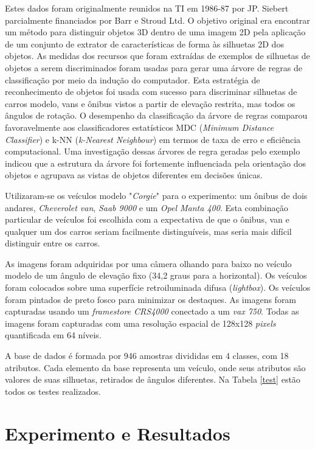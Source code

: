\documentclass[
	article,			%
	11pt,				%
	oneside,			%
	a4paper,			%
	english,			%
	brazil,				%
	sumario=tradicional
	]{abntex2}
\begin{document}
Estes dados foram originalmente reunidos na TI em 1986-87 por JP. Siebert parcialmente financiados por Barr e Stroud Ltd. O objetivo original era encontrar um método para distinguir objetos 3D dentro de uma imagem 2D pela aplicação de um conjunto de extrator de características de forma às silhuetas 2D dos objetos. As medidas dos recursos que foram extraídas de exemplos de silhuetas de objetos a serem discriminados foram usadas para gerar uma árvore de regras de classificação por meio da indução do computador. Esta estratégia de reconhecimento de objetos foi usada com sucesso para discriminar silhuetas de carros modelo, vans e ônibus vistos a partir de elevação restrita, mas todos os ângulos de rotação. O desempenho da classificação da árvore de regras comparou favoravelmente aos classificadores estatísticos MDC (\textit{Minimum Distance Classifier}) e k-NN (\textit{k-Nearest Neighbour}) em termos de taxa de erro e eficiência computacional. Uma investigação dessas árvores de regra geradas pelo exemplo indicou que a estrutura da árvore foi fortemente influenciada pela orientação dos objetos e agrupava as vistas de objetos diferentes em decisões únicas.

Utilizaram-se os veículos modelo "\textit{Corgie}" para o experimento: um ônibus de dois andares, \textit{Cheverolet van}, \textit{Saab 9000} e um \textit{Opel Manta 400}. Esta combinação particular de veículos foi escolhida com a expectativa de que o ônibus, van e qualquer um dos carros seriam facilmente distinguíveis, mas seria mais difícil distinguir entre os carros.

As imagens foram adquiridas por uma câmera olhando para baixo no veículo modelo de um ângulo de elevação fixo (34,2 graus para a horizontal). Os veículos foram colocados sobre uma superfície retroiluminada difusa (\textit{lightbox}). Os veículos foram pintados de preto fosco para minimizar os destaques. As imagens foram capturadas usando um \textit{framestore CRS4000} conectado a um \textit{vax 750}. Todas as imagens foram capturadas com uma resolução espacial de 128x128 \textit{pixels} quantificada em 64 níveis.

A base de dados é formada por 946 amostras divididas em 4 classes, com 18 atributos. Cada elemento da base representa um veículo, onde seus atributos são valores de suas silhuetas, retirados de ângulos diferentes. Na Tabela \ref{test} estão todos os testes realizados.

\section{Experimento e Resultados}
\end{document}
